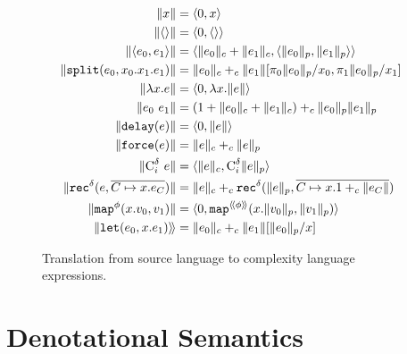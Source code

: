 \begin{figure}[H]
  \caption{Translation from source language to complexity language expressions.}
  \label{fig:complexity_translation_expressions}
  \begin{align*}
    \|x\| &= \langle 0, x \rangle \\
    \|\langle\rangle\| &= \langle 0, \langle\rangle\rangle \\
    \|\langle e_0,e_1 \rangle\| &= \langle \|e_0\|_c + \|e_1\|_c, \langle \|e_0\|_p, \|e_1\|_p\rangle\rangle \\
    \|\texttt{split}(e_0, x_0.x_1.e_1)\| &= \|e_0\|_c +_c \|e_1\|[\pi_0\|e_0\|_p/x_0, \pi_1\|e_0\|_p/x_1] \\
    \|\lambda x.e\| &= \langle 0, \lambda x.\|e\| \rangle \\
    \|e_0\ e_1\| &= (1 + \|e_0\|_c + \|e_1\|_c) +_c \|e_0\|_p \|e_1\|_p \\
    \|\texttt{delay}(e)\| &= \langle 0, \|e\|\rangle \\
    \|\texttt{force}(e)\| &= \|e\|_c +_c \|e\|_p \\
    \|\text{C}^\delta_i\ e\| &= \langle \|e\|_c, \text{C}^\delta_i \|e\|_p \rangle \\
    \|\texttt{rec}^\delta(e, \overline{C \mapsto x.e_C})\| &= \|e\|_c +_c \texttt{rec}^\delta(\|e\|_p, \overline{C \mapsto x.1 +_c \|e_C\|}) \\
    \|\texttt{map}^\phi(x.v_0, v_1)\| &= \langle 0, \texttt{map}^{\langle\!\langle \phi \rangle\!\rangle}(x.\|v_0\|_p, \|v_1\|_p)\rangle \\
    \|\texttt{let}(e_0, x.e_1)\rangle\!\rangle &= \|e_0\|_c +_c \|e_1\|[\|e_0\|_p/x]
  \end{align*}
\end{figure}



\section{Denotational Semantics}

